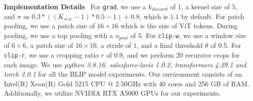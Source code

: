 \textbf{Implementation Details}~
For \texttt{grad}, we use a $k_{discard}$ of $1$, a kernel size of 5, and $\sigma$ as $0.3 * ((K_{size} - 1) * 0.5 - 1) + 0.8$, which is $1.1$ by default. 
For patch pooling, we use a patch size of $16\times16$ which is the size of ViT tokens. During pooling, we use a top pooling with a $n_{pool}$ of $5$. For \texttt{clip-w}, we use a window size of $6\times6$, a patch size of $16\times16$, a stride of $1$, and a final threshold $\theta$ of 0.5. For \texttt{clip-r}, we use a cropping ratio $r$ of 0.9, and we perform 20 recursive crops for each image.
We use \textit{python 3.8.16, salesforce-lavis 1.0.2, transformers 4.29.1 and torch 2.0.1} for all the BLIP model experiments. Our environment consists of an Intel(R) Xeon(R) Gold 5215 CPU @ 2.50GHz with 40 cores and 256 GB of RAM. Additionally, we utilize NVIDIA RTX A5000 GPUs for our experiments. 